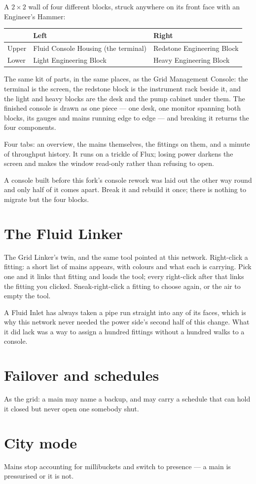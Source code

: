 A $2\times2$ wall of four different blocks, struck anywhere on its front face with an Engineer's
Hammer:

\begin{center}
\small
\begin{tabular}{@{}lll@{}}
\toprule
 & Left & Right \\
\midrule
Upper & Fluid Console Housing (the terminal) & Redstone Engineering Block \\
Lower & Light Engineering Block & Heavy Engineering Block \\
\bottomrule
\end{tabular}
\end{center}

\noindent The same kit of parts, in the same places, as the Grid Management Console: the terminal is
the screen, the redstone block is the instrument rack beside it, and the light and heavy blocks are
the desk and the pump cabinet under them. The finished console is drawn as one piece --- one desk,
one monitor spanning both blocks, its gauges and mains running edge to edge --- and breaking it
returns the four components.

Four tabs: an overview, the mains themselves, the fittings on them, and a minute of throughput
history. It runs on a trickle of Flux; losing power darkens the screen and makes the window
read-only rather than refusing to open.

\begin{ietip}
A console built before this fork's console rework was laid out the other way round and only half of
it comes apart. Break it and rebuild it once; there is nothing to migrate but the four blocks.
\end{ietip}

\section{The Fluid Linker}

The Grid Linker's twin, and the same tool pointed at this network. Right-click a fitting: a short
list of mains appears, with colours and what each is carrying. Pick one and it links that fitting
and loads the tool; every right-click after that links the fitting you clicked. Sneak-right-click a
fitting to choose again, or the air to empty the tool.

\begin{ietip}
A Fluid Inlet has always taken a pipe run straight into any of its faces, which is why this network
never needed the power side's second half of this change. What it did lack was a way to assign a
hundred fittings without a hundred walks to a console.
\end{ietip}

\section{Failover and schedules}

As the grid: a main may name a backup, and may carry a schedule that can hold it closed but never
open one somebody shut.

\section{City mode}

Mains stop accounting for millibuckets and switch to presence --- a main is pressurised or it is
not.
